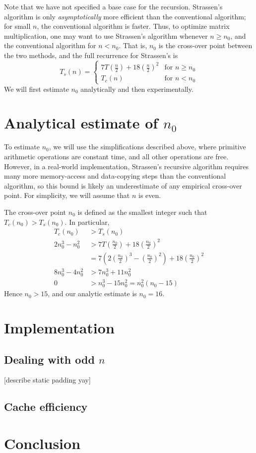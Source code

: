 \documentclass[10pt]{article}
\newcommand{\lp}{\left(}
\newcommand{\rp}{\right)}
\begin{document}
Note that we have not specified a base case for the recursion. Strassen's algorithm is only \emph{asymptotically} more efficient than the conventional algorithm; for small $n$, the conventional algorithm is faster. Thus, to optimize matrix multiplication, one may want to use Strassen's algorithm whenever $n \ge n_0$, and the conventional algorithm for $n < n_0$. That is, $n_0$ is the cross-over point between the two methods, and the full recurrence for Strassen's is
\begin{equation}
T_s(n) = 
\begin{cases}
7T\lp \frac{n}{2} \rp + 18\lp \frac{n}{2} \rp ^2 &\text{for $n \ge n_0$}\\
T_c(n) & \text{for $n < n_0$}
\end{cases}
\end{equation}
We will first estimate $n_0$ analytically and then experimentally. 
\\

\section{Analytical estimate of $n_0$}

To estimate $n_0$, we will use the simplifications described above, where primitive arithmetic operations are constant time, and all other operations are free. However, in a real-world implementation, Strassen's recursive algorithm requires many more memory-access and data-copying steps than the conventional algorithm, so this bound is likely an underestimate of any empirical cross-over point. For simplicity, we will assume that $n$ is even.

The cross-over point $n_0$ is defined as the smallest integer such that $T_c(n_0) > T_s(n_0)$. In particular, 
\begin{align*}
T_c(n_0) &> T_s(n_0)\\
2n_0^3 - n_0^2 &> 7T\lp \frac{n_0}{2} \rp + 18\lp \frac{n_0}{2} \rp ^2\\
&= 7\lp2\lp \frac{n_0}{2} \rp^3 - \lp \frac{n_0}{2} \rp^2\rp + 18\lp \frac{n_0}{2} \rp ^2\\
8n_0^3 - 4n_0^2 &> 7n_0^3 + 11 n_0^2 \\
0 &> n_0^3 - 15 n_0^2 = n_0^2(n_0-15)
\end{align*}
Hence $n_0 > 15$, and our analytic estimate is $n_0 = 16$.

\section {Implementation}



\subsection{Dealing with odd $n$}
[describe static padding yay]

\subsection{Cache efficiency}




\section {Conclusion}
\end{document}
